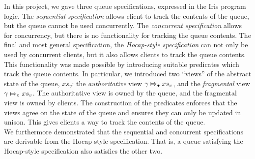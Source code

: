 \documentclass[a4paper, 10pt]{report}
\theoremstyle{definition}
\newcommand{\absvalueList}{xs_v}
\newcommand{\abstractstatefullfrag}[2]{#1 \Mapsto_{\circ} #2}
\newcommand{\abstractstateauth}[2]{#1 \Mapsto_{\bullet} #2}
\begin{document}
In this project, we gave three queue specifications, expressed in the Iris program logic. The \textit{sequential specification} allows client to track the contents of the queue, but the queue cannot be used concurrently. The \textit{concurrent specification} allows for concurrency, but there is no functionality for tracking the queue contents. The final and most general specification, the \textit{Hocap-style specification} can not only be used by concurrent clients, but it also allows clients to track the queue contents. This functionality was made possible by introducing suitable predicates which track the queue contents. In particular, we introduced two ``views'' of the abstract state of the queue, $\absvalueList$: the \textit{authoritative} view $\abstractstateauth{\gname}{\absvalueList}$, and the \textit{fragmental} view $\abstractstatefullfrag{\gname}{\absvalueList}$. The authoritative view is owned by the queue, and the fragmental view is owned by clients. The construction of the predicates enforces that the views agree on the state of the queue and ensures they can only be updated in unison. This gives clients a way to track the contents of the queue.\\
We furthermore demonstrated that the sequential and concurrent specifications are derivable from the Hocap-style specification. That is, a queue satisfying the Hocap-style specification also satisfies the other two.
\end{document}
